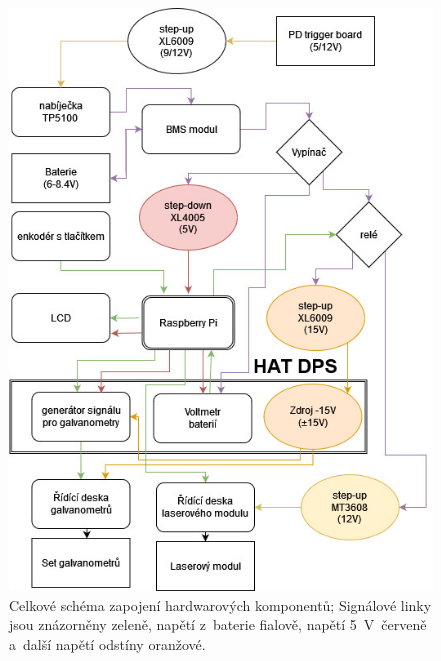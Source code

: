 \begin{figure}[H]
  \centering
  \includegraphics[width=\textwidth{}, trim=0 0 0 300, clip]{img/whole-scheme.jpg}\clearpage
  \caption{\label{fig:scheme-whole} Celkové schéma zapojení hardwarových komponentů; Signálové linky jsou znázorněny zeleně, napětí z~baterie fialově, napětí 5~V~červeně a~další napětí odstíny oranžové.}
\end{figure}

